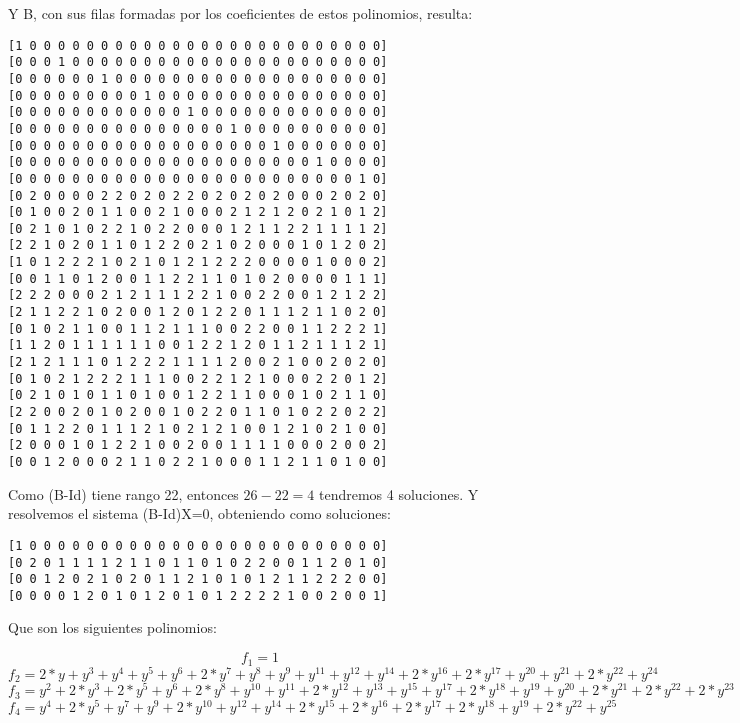 \documentclass[a4paper]{article}
\begin{document}
Y B, con sus filas formadas por los coeficientes de estos polinomios, resulta:

\begin{verbatim}
[1 0 0 0 0 0 0 0 0 0 0 0 0 0 0 0 0 0 0 0 0 0 0 0 0 0]
[0 0 0 1 0 0 0 0 0 0 0 0 0 0 0 0 0 0 0 0 0 0 0 0 0 0]
[0 0 0 0 0 0 1 0 0 0 0 0 0 0 0 0 0 0 0 0 0 0 0 0 0 0]
[0 0 0 0 0 0 0 0 0 1 0 0 0 0 0 0 0 0 0 0 0 0 0 0 0 0]
[0 0 0 0 0 0 0 0 0 0 0 0 1 0 0 0 0 0 0 0 0 0 0 0 0 0]
[0 0 0 0 0 0 0 0 0 0 0 0 0 0 0 1 0 0 0 0 0 0 0 0 0 0]
[0 0 0 0 0 0 0 0 0 0 0 0 0 0 0 0 0 0 1 0 0 0 0 0 0 0]
[0 0 0 0 0 0 0 0 0 0 0 0 0 0 0 0 0 0 0 0 0 1 0 0 0 0]
[0 0 0 0 0 0 0 0 0 0 0 0 0 0 0 0 0 0 0 0 0 0 0 0 1 0]
[0 2 0 0 0 0 2 2 0 2 0 2 2 0 2 0 2 0 2 0 0 0 2 0 2 0]
[0 1 0 0 2 0 1 1 0 0 2 1 0 0 0 2 1 2 1 2 0 2 1 0 1 2]
[0 2 1 0 1 0 2 2 1 0 2 2 0 0 0 1 2 1 1 2 2 1 1 1 1 2]
[2 2 1 0 2 0 1 1 0 1 2 2 0 2 1 0 2 0 0 0 1 0 1 2 0 2]
[1 0 1 2 2 2 1 0 2 1 0 1 2 1 2 2 2 0 0 0 0 1 0 0 0 2]
[0 0 1 1 0 1 2 0 0 1 1 2 2 1 1 0 1 0 2 0 0 0 0 1 1 1]
[2 2 2 0 0 0 2 1 2 1 1 1 2 2 1 0 0 2 2 0 0 1 2 1 2 2]
[2 1 1 2 2 1 0 2 0 0 1 2 0 1 2 2 0 1 1 1 2 1 1 0 2 0]
[0 1 0 2 1 1 0 0 1 1 2 1 1 1 0 0 2 2 0 0 1 1 2 2 2 1]
[1 1 2 0 1 1 1 1 1 1 0 0 1 2 2 1 2 0 1 1 2 1 1 1 2 1]
[2 1 2 1 1 1 0 1 2 2 2 1 1 1 1 2 0 0 2 1 0 0 2 0 2 0]
[0 1 0 2 1 2 2 2 1 1 1 0 0 2 2 1 2 1 0 0 0 2 2 0 1 2]
[0 2 1 0 1 0 1 1 0 1 0 0 1 2 2 1 1 0 0 0 1 0 2 1 1 0]
[2 2 0 0 2 0 1 0 2 0 0 1 0 2 2 0 1 1 0 1 0 2 2 0 2 2]
[0 1 1 2 2 0 1 1 1 2 1 0 2 1 2 1 0 0 1 2 1 0 2 1 0 0]
[2 0 0 0 1 0 1 2 2 1 0 0 2 0 0 1 1 1 1 0 0 0 2 0 0 2]
[0 0 1 2 0 0 0 2 1 1 0 2 2 1 0 0 0 1 1 2 1 1 0 1 0 0]
\end{verbatim}

Como (B-Id) tiene rango 22, entonces $26-22=4$ tendremos 4 soluciones.
Y resolvemos el sistema (B-Id)X=0, obteniendo como soluciones:

\begin{verbatim}
[1 0 0 0 0 0 0 0 0 0 0 0 0 0 0 0 0 0 0 0 0 0 0 0 0 0]
[0 2 0 1 1 1 1 2 1 1 0 1 1 0 1 0 2 2 0 0 1 1 2 0 1 0]
[0 0 1 2 0 2 1 0 2 0 1 1 2 1 0 1 0 1 2 1 1 2 2 2 0 0]
[0 0 0 0 1 2 0 1 0 1 2 0 1 0 1 2 2 2 2 1 0 0 2 0 0 1]
\end{verbatim}

Que son los siguientes polinomios:

$$f_1 = 1$$
$$f_2 = 2*y+y^3+y^4+y^5+y^6+2*y^7+y^8+y^9+y^{11}+y^{12}+y^{14}+2*y^{16}+2*y^{17}+y^{20}+y^{21}+2*y^{22}+y^{24}$$
$$f_3 = y^2+2*y^3+2*y^5+y^6+2*y^8+y^{10}+y^{11}+2*y^{12}+y^{13}+y^{15}+y^{17}+2*y^{18}+y^{19}+y^{20}+2*y^{21}+2*y^{22}+2*y^{23}$$
$$f_4 = y^4+2*y^5+y^7+y^9+2*y^{10}+y^{12}+y^{14}+2*y^{15}+2*y^{16}+2*y^{17}+2*y^{18}+y^{19}+2*y^{22}+y^{25}$$
\end{document}
